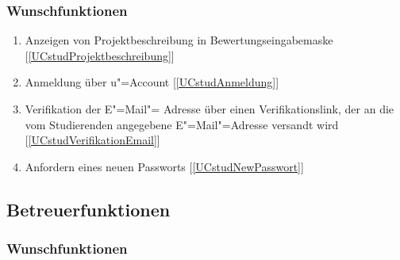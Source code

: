 \documentclass[parskip=full]{scrartcl}
\newcommand{\swtLabel}[1]{\textbf{/#1\arabic*0/}}
\newcommand{\testRef}[1]{[\ref{#1}]}
\begin{document}
\subsubsection{Wunschfunktionen}

\begin{enumerate}[label=\swtLabel{FA}, resume]
	\item Anzeigen von Projektbeschreibung in Bewertungseingabemaske
	\label{FAbeschreibung-Bewertung} \testRef{UCstudProjektbeschreibung}
	\item Anmeldung über u"=Account \label{FAstudUanmeldung} \testRef{UCstudAnmeldung}%
	\item Verifikation der E"=Mail"= Adresse über einen Verifikationslink, der an
	die vom Studierenden angegebene E"=Mail"=Adresse versandt wird
	\label{FAemailverifikation} \testRef{UCstudVerifikationEmail}
	\item Anfordern eines neuen Passworts \label{FApasswortvergessen}
	\testRef{UCstudNewPasswort}
\end{enumerate}

\subsection{Betreuerfunktionen}
\subsubsection{Wunschfunktionen}
\end{document}
